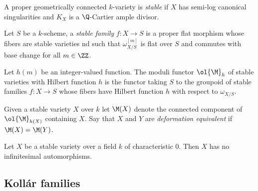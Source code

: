 \documentclass[12pt]{article}
\begin{document}
\begin{defn}
A proper geometrically connected $k$-variety is \textit{stable} if $X$ has semi-log canonical singularities and $K_X$ is a $\Q$-Cartier ample divisor.
\end{defn}

\begin{defn}
Let $S$ be a $k$-scheme, a \textit{stable family} $f : X \to S$ is a proper flat morphism whose fibers are stable varieties nd such that $\omega_{X/S}^{[m]}$ is flat over $S$ and commutes with base change for all $m \in \ZZ$.
\end{defn}

\begin{defn}
Let $h(m)$ be an integer-valued function. The moduli functor $\ol{\M}_h$ of stable varieties with Hilbert function $h$ is the functor taking $S$ to the groupoid of stable families $f : X \to S$ whose fibers have Hilbert function $h$ with respect to $\omega_{X/S}$. 
\end{defn}

\begin{defn}
Given a stable variety $X$ over $k$ let $\M(X)$ denote the connected component of $\ol{\M}_{h(X)}$ containing $X$. Say that $X$ and $Y$ are \textit{deformation equivalent} if $\M(X) = \M(Y)$.
\end{defn}

\begin{lemma}[BHPS]
Let $X$ be a stable variety over a field $k$ of characteristic $0$. Then $X$ has no infinitesimal automorphisms. 
\end{lemma}

\subsection{Koll\'{a}r families}
\end{document}
